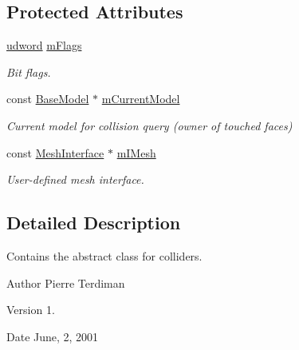 \subsection*{Protected Attributes}
\begin{DoxyCompactItemize}
\item 
\hyperlink{IceTypes_8h_a44c6f1920ba5551225fb534f9d1a1733}{udword} \hyperlink{classCollider_addb58ecc6bcc487ffadc95261aef5a9c}{m\+Flags}\hypertarget{classCollider_addb58ecc6bcc487ffadc95261aef5a9c}{}\label{classCollider_addb58ecc6bcc487ffadc95261aef5a9c}

\begin{DoxyCompactList}\small\item\em Bit flags. \end{DoxyCompactList}\item 
const \hyperlink{classBaseModel}{Base\+Model} $\ast$ \hyperlink{classCollider_a805dbb0b279950de2cd8b186f670629c}{m\+Current\+Model}\hypertarget{classCollider_a805dbb0b279950de2cd8b186f670629c}{}\label{classCollider_a805dbb0b279950de2cd8b186f670629c}

\begin{DoxyCompactList}\small\item\em Current model for collision query (owner of touched faces) \end{DoxyCompactList}\item 
const \hyperlink{classMeshInterface}{Mesh\+Interface} $\ast$ \hyperlink{classCollider_a813d9df8888b7e8932871af4b75e34f9}{m\+I\+Mesh}\hypertarget{classCollider_a813d9df8888b7e8932871af4b75e34f9}{}\label{classCollider_a813d9df8888b7e8932871af4b75e34f9}

\begin{DoxyCompactList}\small\item\em User-\/defined mesh interface. \end{DoxyCompactList}\end{DoxyCompactItemize}


\subsection{Detailed Description}
Contains the abstract class for colliders.

\begin{DoxyAuthor}{Author}
Pierre Terdiman 
\end{DoxyAuthor}
\begin{DoxyVersion}{Version}
1. 
\end{DoxyVersion}
\begin{DoxyDate}{Date}
June, 2, 2001 
\end{DoxyDate}


